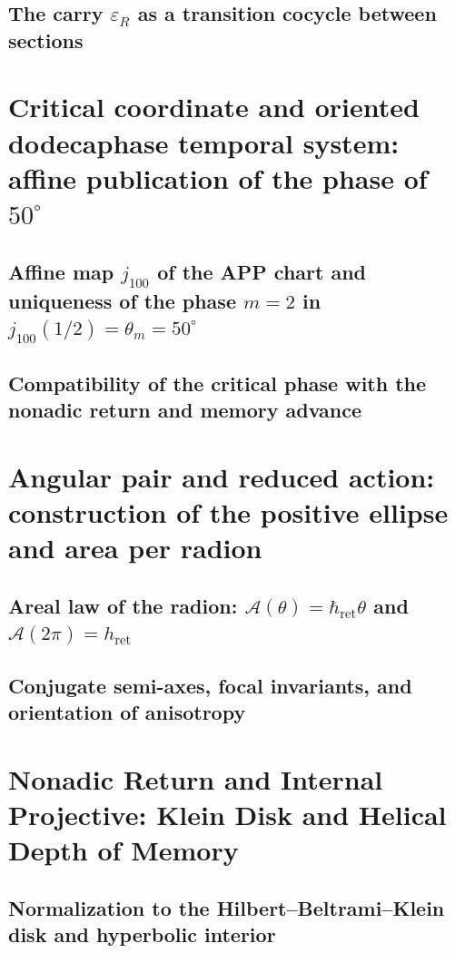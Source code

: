 \subsection{The carry \(\varepsilon_R\) as a transition cocycle between sections}


\section{Critical coordinate and oriented dodecaphase temporal system: affine publication of the phase of \(50^\circ\)}
\subsection{Affine map \(j_{100}\) of the APP chart and uniqueness of the phase \(m=2\) in \(j_{100}(1/2)=\theta_m=50^\circ\)}

\subsection{Compatibility of the critical phase with the nonadic return and memory advance}


\section{Angular pair and reduced action: construction of the positive ellipse and area per radion}
\subsection{Areal law of the radion: \(\mathcal A(\theta)=\hbar_{\mathrm{ret}}\theta\) and \(\mathcal A(2\pi)=h_{\mathrm{ret}}\)}

\subsection{Conjugate semi-axes, focal invariants, and orientation of anisotropy}


\section{Nonadic Return and Internal Projective: Klein Disk and Helical Depth of Memory}
\subsection{Normalization to the Hilbert--Beltrami--Klein disk and hyperbolic interior}

